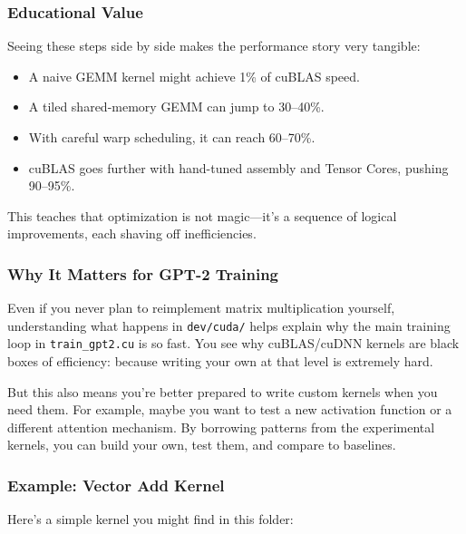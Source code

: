 \documentclass[
  letterpaper,
  DIV=11,
  numbers=noendperiod]{scrreprt}
\providecommand{\tightlist}{%
  \setlength{\itemsep}{0pt}\setlength{\parskip}{0pt}}
\begin{document}
\subsubsection{Educational Value}\label{educational-value}

Seeing these steps side by side makes the performance story very
tangible:

\begin{itemize}
\tightlist
\item
  A naive GEMM kernel might achieve 1\% of cuBLAS speed.
\item
  A tiled shared-memory GEMM can jump to 30--40\%.
\item
  With careful warp scheduling, it can reach 60--70\%.
\item
  cuBLAS goes further with hand-tuned assembly and Tensor Cores, pushing
  90--95\%.
\end{itemize}

This teaches that optimization is not magic---it's a sequence of logical
improvements, each shaving off inefficiencies.

\subsubsection{Why It Matters for GPT-2
Training}\label{why-it-matters-for-gpt-2-training}

Even if you never plan to reimplement matrix multiplication yourself,
understanding what happens in \texttt{dev/cuda/} helps explain why the
main training loop in \texttt{train\_gpt2.cu} is so fast. You see why
cuBLAS/cuDNN kernels are black boxes of efficiency: because writing your
own at that level is extremely hard.

But this also means you're better prepared to write custom kernels when
you need them. For example, maybe you want to test a new activation
function or a different attention mechanism. By borrowing patterns from
the experimental kernels, you can build your own, test them, and compare
to baselines.

\subsubsection{Example: Vector Add
Kernel}\label{example-vector-add-kernel}

Here's a simple kernel you might find in this folder:
\end{document}
